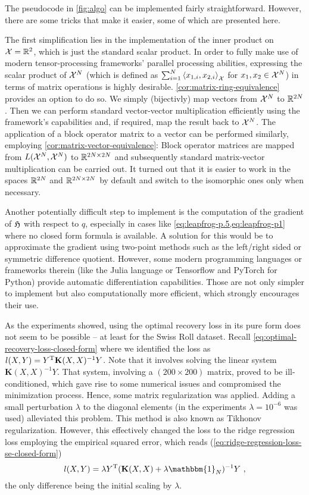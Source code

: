 The pseudocode in \cref{fig:algo} can be implemented fairly straightforward.
However, there are some tricks that make it easier, some of which are presented here.

The first simplification lies in the implementation of the inner product on $\mathcal{X} = \mathbb{R}^2$, which is just the standard scalar product.
In order to fully make use of modern tensor-processing frameworks' parallel processing abilities, expressing the scalar product of $\mathcal{X}^N$ (which is defined as $\sum_{i=1}^N \left<x_{1, i}, x_{2, i}\right>_{\mathcal{X}}$ for $x_1, x_2 \in \mathcal{X}^N$) in terms of matrix operations is highly desirable.
\cref{cor:matrix-ring-equivalence} provides an option to do so.
We simply (bijectivly) map vectors from $\mathcal{X}^N$ to $\mathbb{R}^{2N}$.
Then we can perform standard vector-vector multiplication efficiently using the framework's capabilities and, if required, map the result back to $\mathcal{X}^N$.
The application of a block operator matrix to a vector can be performed similarly, employing \cref{cor:matrix-vector-equivalence}:
Block operator matrices are mapped from $L(\mathcal{X}^N, \mathcal{X}^N)$ to $\mathbb{R}^{2N \times 2N}$ and subsequently standard matrix-vector multiplication can be carried out.
It turned out that it is easier to work in the spaces $\mathbb{R}^{2N}$ and $\mathbb{R}^{2N \times 2N}$ by default and switch to the isomorphic ones only when necessary.

Another potentially difficult step to implement is the computation of the gradient of $\mathfrak{H}$ with respect to $q$, especially in cases like \cref{eq:leapfrog-p.5,eq:leapfrog-p1} where no closed form formula is available.
A solution for this would be to approximate the gradient using two-point methods such as the left/right sided or symmetric difference quotient.
However, some modern programming languages or frameworks therein (like the Julia language or Tensorflow and PyTorch for Python) provide automatic differentiation capabilities.
Those are not only simpler to implement but also computationally more efficient, which strongly encourages their use.

As the experiments showed, using the optimal recovery loss in its pure form does not seem to be possible -- at least for the Swiss Roll dataset.
Recall \cref{eq:optimal-recovery-loss-closed-form} where we identified the loss as $l(X, Y) = Y^{\mathrm{T}} \mathbf{K}(X, X)^{-1} Y$.
Note that it involves solving the linear system $\mathbf{K}(X, X)^{-1} Y$.
That system, involving a $(200\times200)$ matrix, proved to be ill-conditioned, which gave rise to some numerical issues and compromised the minimization process.
Hence, some matrix regularization was applied.
Adding a small perturbation $\lambda$ to the diagonal elements (in the experiments $\lambda = 10^{-6}$ was used) alleviated this problem.
This method is also known as Tikhonov regularization.
However, this effectively changed the loss to the ridge regression loss employing the empirical squared error, which reads (\cref{eq:ridge-regression-loss-se-closed-form})
\begin{equation}
	l(X, Y) = \lambda Y^\T (\mathbf{K}(X, X) + \lambda \mathbbm{1}_N)^{-1} Y \ ,
\end{equation}
the only difference being the initial scaling by $\lambda$.

